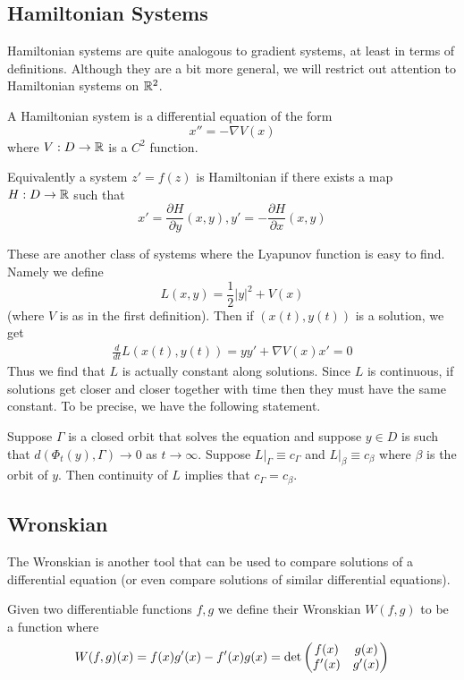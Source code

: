 \subsection{Hamiltonian Systems}
Hamiltonian systems are quite analogous to gradient systems, at least in terms of definitions. Although they are a bit more general, we will restrict out attention to Hamiltonian systems on $\mathbb{R}^2$.
\begin{definition}
A Hamiltonian system is a differential equation of the form 
$$x'' = - \nabla V(x)$$ 
where $V: D \to \mathbb{R}$ is a $C^2$ function.

Equivalently a system $z' = f(z)$ is Hamiltonian if there exists a map $H: D \to \mathbb{R}$ such that 
$$ x' = \frac{\partial H}{\partial y}(x, y), y' = -\frac{\partial H}{\partial x}(x, y) $$
\end{definition}

\noindent These are another class of systems where the Lyapunov function is easy to find. Namely we define
$$ L(x, y) = \frac{1}{2} |y|^2 + V(x) $$
(where $V$ is as in the first definition). Then if $(x(t), y(t))$ is a solution, we get
\begin{align*}
    \frac{d}{dt} L(x(t), y(t)) = y y' + \nabla V(x) x' = 0
\end{align*}
Thus we find that $L$ is actually constant along solutions. Since $L$ is continuous, if solutions get closer and closer together with time then they must have the same constant. To be precise, we have the following statement.

Suppose $\Gamma$ is a closed orbit that solves the equation and suppose $y \in D$ is such that $d(\Phi_t(y), \Gamma) \to 0$ as $t \to \infty$. Suppose $L|_{\Gamma} \equiv c_\Gamma$ and $L|_{\beta} \equiv c_\beta$ where $\beta$ is the orbit of $y$. Then continuity of $L$ implies that $c_\Gamma = c_{\beta}$.

\subsection{Wronskian}
The Wronskian is another tool that can be used to compare solutions of a differential equation (or even compare solutions of similar differential equations).
\begin{definition}[Wronskian]
Given two differentiable functions $f, g$ we define their Wronskian $W(f, g)$ to be a function where
$$ W(f, g)(x) = f(x) g'(x) - f'(x) g(x) = \det \begin{pmatrix} f(x) & g(x)\\f'(x) & g'(x) \end{pmatrix} $$
\end{definition}

